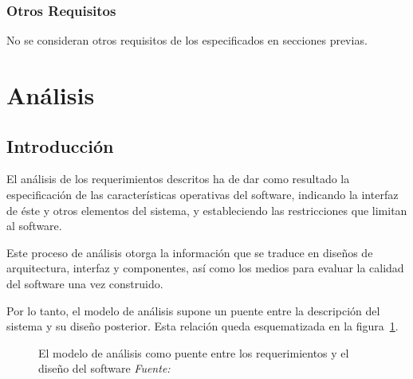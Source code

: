 \subsubsection{Otros Requisitos}

No se consideran otros requisitos de los especificados en secciones previas.



\section{Análisis}
\label{sec:secModeloAn}

\subsection{Introducción}

El análisis de los requerimientos descritos ha de dar como resultado la especificación de las características operativas del software, indicando la interfaz de éste y otros elementos del sistema, y estableciendo las restricciones que limitan al software.

Este proceso de análisis otorga la información que se traduce en diseños de arquitectura, interfaz y componentes, así como los medios para evaluar la calidad del software una vez construido. 

Por lo tanto, el modelo de análisis supone un puente entre la descripción del sistema y su diseño posterior. Esta relación queda esquematizada en la figura~\ref{fig:modeloAnalisis}.

\begin{figure}
	\centering
	\caption[El modelo de análisis como puente entre los requerimientos y el diseño del software]{El modelo de análisis como puente entre los requerimientos y el diseño del software \textit{Fuente:~\cite{Pre10}}}
	\label{fig:modeloAnalisis}
\end{figure}

